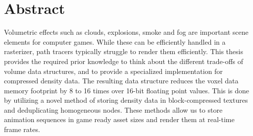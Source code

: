 \section*{Abstract} \label{abstract}
Volumetric effects such as clouds, explosions, smoke and fog are important scene elements for computer games. While these can be efficiently handled in a rasterizer, path tracers typically struggle to render them efficiently. This thesis provides the required prior knowledge to think about the different trade-offs of volume data structures, and to provide a specialized implementation for compressed density data. The resulting data structure reduces the voxel data memory footprint by 8 to 16 times over 16-bit floating point values. This is done by utilizing a novel method of storing density data in block-compressed textures and deduplicating homogeneous nodes. These methods allow us to store animation sequences in game ready asset sizes and render them at real-time frame rates.